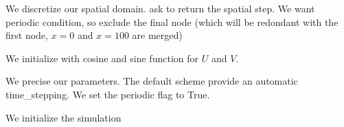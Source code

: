 \documentclass[letterpaper,10pt,english]{sphinxmanual}
\begin{document}
We discretize our spatial domain.  ask to return the
spatial step. We want periodic condition, so  exclude
the final node (which will be redondant with the first node, \(x=0\)
and \(x=100\) are merged)

\begin{sphinxVerbatim}[commandchars=\\\{\}]
       
\end{sphinxVerbatim}

We initialize with cosine and sine function for \(U\) and \(V\).

\begin{sphinxVerbatim}[commandchars=\\\{\}]
              
              
    
\end{sphinxVerbatim}

We precise our parameters. The default scheme provide an automatic
time\_stepping. We set the periodic flag to True.

\begin{sphinxVerbatim}[commandchars=\\\{\}]
    
\end{sphinxVerbatim}

We initialize the simulation
\end{document}
